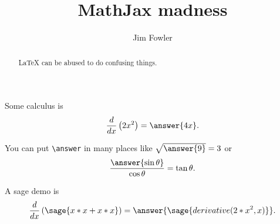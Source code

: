 \documentclass{ximera}
\title{MathJax madness}
\author{Jim Fowler}
\begin{document}
\begin{abstract}
  LaTeX can be abused to do confusing things.
\end{abstract}

\maketitle

\begin{problem}
  Some calculus is
  \[
    \frac{d}{dx} \left( 2x^2 \right) = \answer{4x}.
  \]

  You can put \verb|\answer| in many places
    like \(\sqrt{\answer{9}} = 3\)
    or \[
      \frac{\answer{\sin \theta}}{\cos \theta} = \tan \theta.
    \]
\end{problem}

\begin{problem}
  A sage demo is
  \[
    \frac{d}{dx} \left( \sage{x*x + x*x} \right) =
      \answer{\sage{derivative(2*x^2,x)}}.
  \]
\end{problem}
\end{document}
